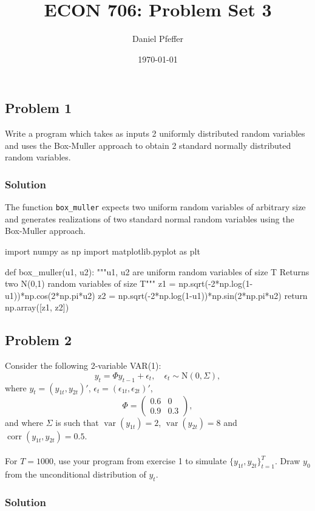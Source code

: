 \documentclass[oneside, a4paper]{amsart}
\title{ECON 706: Problem Set 3}
\author{Daniel Pfeffer}
\date{\today}
\DeclareMathOperator{\var}{var}
\DeclareMathOperator{\corr}{corr}
\newcommand{\eps}{\epsilon}
\newcommand{\N}{\mathrm N}
\begin{document}
\maketitle


\subsection*{Problem 1}

Write a program which takes as inputs 2 uniformly distributed random variables and uses the Box-Muller approach to obtain 2 standard normally distributed random variables.

\subsubsection*{Solution}


The function \texttt{box_muller} expects two uniform random variables of arbitrary size and generates realizations of two standard normal random variables using the Box-Muller approach.
\begin{python3code}
import numpy as np
import matplotlib.pyplot as plt

def box_muller(u1, u2):
    """u1, u2 are uniform random variables of size T
    Returns two N(0,1) random variables of size T"""
    z1 = np.sqrt(-2*np.log(1-u1))*np.cos(2*np.pi*u2)
    z2 = np.sqrt(-2*np.log(1-u1))*np.sin(2*np.pi*u2)
    return np.array([z1, z2])
\end{python3code}

\subsection*{Problem 2}

Consider the following 2-variable VAR(1):
\[
	y_t = \Phi y_{t-1} + \eps_t, \quad \eps_t \sim \N(0, \Sigma),
\]
where $y_t = (y_{1t}, y_{2t})'$, $\eps_t = (\eps_{1t}, \eps_{2t})'$, 
\[
	\Phi = \begin{pmatrix}
		0.6 & 0 \\
		0.9 & 0.3 
	\end{pmatrix},
\]
and where $\Sigma$ is such that $\var(y_{1t}) = 2$, $\var(y_{2t}) = 8$ and  $\corr(y_{1t}, y_{2t}) = 0.5$. 
\\ \\
For $T=1000$, use your program from exercise 1 to simulate $\{y_{1t}, y_{2t}\}_{t=1}^T$. Draw $y_0$ from the unconditional distribution of $y_t$.

\subsubsection*{Solution}
\end{document}
